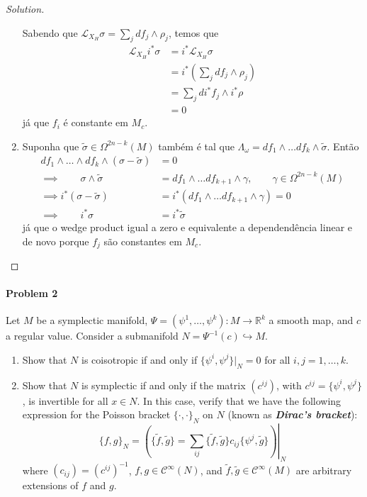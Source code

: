 \begin{proof}[Solution]
\begin{enumerate}[label=\alph*.]
		Sabendo que $ \mathcal{L}_{X_H}\sigma=\sum_{j}df_j\wedge \rho_j$, temos que
		\begin{align*}
			\mathcal{L}_{X_H}i^*\sigma&=i^*\mathcal{L}_{X_H}\sigma\\
			&=i^*\left(\sum_{j}df_j\wedge \rho_j\right)\\
			&=\sum_{j}di^*f_j\wedge i^*\rho\\
			&=0
		\end{align*}
		já que $f_i$ é constante em $M_c$.

		\item Suponha que $\tilde{\sigma}\in\Omega^{2n-k}(M)$ também é tal que $\Lambda_\omega =df_1\wedge \ldots df_k\wedge \tilde{ \sigma}$. Então
			\begin{align*}
				df_1\wedge \ldots \wedge df_k\wedge (\sigma-\tilde{\sigma})&=0\\
				\implies \qquad \sigma\wedge \tilde{\sigma}&=df_1\wedge \ldots df_{k+1}\wedge \gamma, \qquad \gamma \in\Omega^{2n-k}(M)\\
				\implies i^*(\sigma-\tilde{\sigma})&=i^*(df_1\wedge \ldots df_{k+1}\wedge \gamma)=0\\
				\implies\qquad  i^*\sigma &=i^*\tilde{\sigma}
			\end{align*}
			já que o wedge product igual a zero e equivalente a dependendência linear e de novo porque $f_j$ são constantes em $M_c$.
	\end{enumerate}
\end{proof}

\paragraph{Problem 2} Let $M$ be a symplectic manifold, $\Psi=(\psi^1,\ldots,\psi^k):M\to \mathbb{R}^{k}$ a smooth map, and $c$ a regular value. Consider a submanifold $N=\Psi^{-1}(c)\hookrightarrow M$.
\begin{enumerate}[label=\alph*.]
	\item Show that $N$ is coisotropic if and only if $\{\psi^i,\psi^j\}|_{N}=0$ for all $i,j=1,\ldots,k$.
	
	\item Show that $N$ is symplectic if and only if the matrix $(c^{ij})$, with $c^{ij}=\{\psi^i,\psi^j\}$, is invertible for all $x\in N$. In this case, verify that we have the following expression for the Poisson bracket $\{\cdot,\cdot\}_N$ on $N$ (known as \textit{\textbf{Dirac's bracket}}):
	\[\{f,g\}_N=\left.\left(\{\tilde{f},\tilde{g}\} =\sum_{ij}\{\tilde{f},\tilde{g}\} c_{ij}\{\psi^j,\tilde{g}\}\right)\right|_{N}\]
		where $(c_{ij})=(c^{ij })^{-1}$, $f,g\in \mathcal{C}^\infty(N)$, and $\tilde{f},\tilde{g}\in\mathcal{C}^\infty(M)$ are arbitrary extensions of $f$ and $g$.
\end{enumerate}

